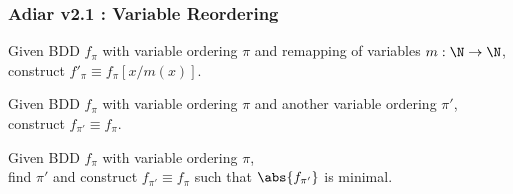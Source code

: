 \documentclass[english, aspectratio=169]{beamer}
\begin{document}
\begin{frame}
  \frametitle{Adiar v2.1 : Variable Reordering}

  \begin{problem}
    Given BDD $f_{\pi}$ with variable ordering $\pi$ and remapping of variables
    $m : \N \rightarrow \N$,\\
    construct $f'_{\pi} \equiv f_{\pi}[x / m(x)]$.
  \end{problem}

  \pause

  \begin{problem}
    Given BDD $f_{\pi}$ with variable ordering $\pi$ and another variable
    ordering $\pi'$,\\
    construct $f_{\pi'} \equiv f_{\pi}$.
  \end{problem}

  \pause

  \begin{problem}
    Given BDD $f_{\pi}$ with variable ordering $\pi$,\\
    find $\pi'$ and construct $f_{\pi'} \equiv f_{\pi}$ such that
    $\abs{f_{\pi'}}$ is minimal.
  \end{problem}
\end{frame}

\blankframe

\begin{frame}{} %
  \begin{figure}
    \centering


    \begin{tikzpicture}
      
    \end{tikzpicture}
  \end{figure}
\end{frame}
\end{document}
